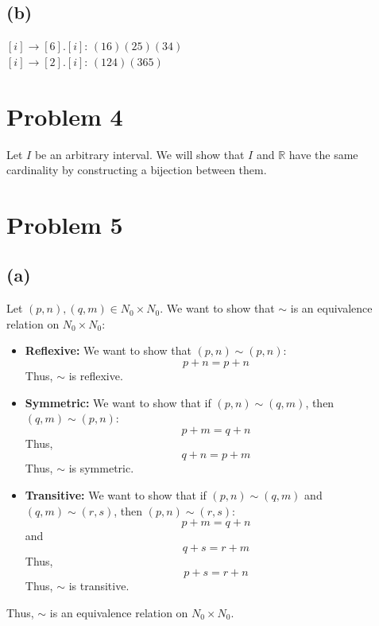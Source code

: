 \documentclass{article}
\begin{document}
\subsection*{(b)}
\([i] \rightarrow [6].[i]\):
\(
   (16)(25)(34)
\)
\\
\([i] \rightarrow [2].[i]\):
\(
   (124)(365)
\)

\section*{Problem 4}


Let \(I\) be an arbitrary interval. We will show that \(I\) and \(\mathbb{R}\) have the same cardinality by constructing a bijection between them.


\section*{Problem 5}


\subsection*{(a)}
Let \((p, n), (q, m) \in N_0 \times N_0\). We want to show that \(\sim\) is an equivalence relation on \(N_0 \times N_0\):
\begin{itemize}
   \item \textbf{Reflexive:} We want to show that \((p, n) \sim (p, n)\):
   \[
      p + n = p + n
   \]
   Thus, \(\sim\) is reflexive.
   \item \textbf{Symmetric:} We want to show that if \((p, n) \sim (q, m)\), then \((q, m) \sim (p, n)\):
   \[
      p + m = q + n
   \]
   Thus,
   \[
      q + n = p + m
   \]
   Thus, \(\sim\) is symmetric.
   \item \textbf{Transitive:} We want to show that if \((p, n) \sim (q, m)\) and \((q, m) \sim (r, s)\), then \((p, n) \sim (r, s)\):
   \[
      p + m = q + n
   \]
   and
   \[
      q + s = r + m
   \]
   Thus,
   \[
      p + s = r + n
   \]
   Thus, \(\sim\) is transitive.
\end{itemize}
Thus, \(\sim\) is an equivalence relation on \(N_0 \times N_0\).
\end{document}
